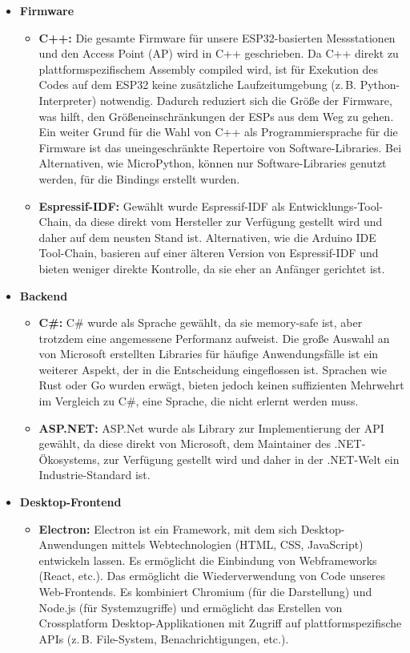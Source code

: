 \documentclass{article}
\begin{document}
\begin{itemize}
  \item \textbf{Firmware}
    \begin{itemize}
      \item \textbf{C++:} Die gesamte Firmware für unsere ESP32-basierten Messstationen und den Access Point (AP) wird in C++ geschrieben. Da C++ direkt zu plattformspezifischem Assembly compiled wird, ist für Exekution des Codes auf dem ESP32 keine zusätzliche Laufzeitumgebung (z.\,B. Python-Interpreter) notwendig. Dadurch reduziert sich die Größe der Firmware, was hilft, den Größeneinschränkungen der ESPs aus dem Weg zu gehen. Ein weiter Grund für die Wahl von C++ als Programmiersprache für die Firmware ist das uneingeschränkte Repertoire von Software-Libraries. Bei Alternativen, wie MicroPython, können nur Software-Libraries genutzt werden, für die Bindings erstellt wurden.
      \item \textbf{Espressif-IDF:} Gewählt wurde Espressif-IDF als Entwicklungs-Tool-Chain, da diese direkt vom Hersteller zur Verfügung gestellt wird und daher auf dem neusten Stand ist. Alternativen, wie die Arduino IDE Tool-Chain, basieren auf einer älteren Version von Espressif-IDF und bieten weniger direkte Kontrolle, da sie eher an Anfänger gerichtet ist.
    \end{itemize}

  \item \textbf{Backend}
    \begin{itemize}
      \item \textbf{C\#:} C\# wurde als Sprache gewählt, da sie memory-safe ist, aber trotzdem eine angemessene Performanz aufweist. Die große Auswahl an von Microsoft erstellten Libraries für häufige Anwendungsfälle ist ein weiterer Aspekt, der in die Entscheidung eingeflossen ist. Sprachen wie Rust oder Go wurden erwägt, bieten jedoch keinen suffizienten Mehrwehrt im Vergleich zu C\#, eine Sprache, die nicht erlernt werden muss.
      \item \textbf{ASP.NET:} ASP.Net wurde als Library zur Implementierung der API gewählt, da diese direkt von Microsoft, dem Maintainer des .NET-Ökosystems, zur Verfügung gestellt wird und daher in der .NET-Welt ein Industrie-Standard ist.
    \end{itemize}

  \item \textbf{Desktop-Frontend}
    \begin{itemize}
      \item \textbf{Electron:} Electron ist ein Framework, mit dem sich Desktop-Anwendungen mittels Webtechnologien (HTML, CSS, JavaScript) entwickeln lassen. Es ermöglicht die Einbindung von Webframeworks (React, etc.). Das ermöglicht die Wiederverwendung von Code unseres Web-Frontends. Es kombiniert Chromium (für die Darstellung) und Node.js (für Systemzugriffe) und ermöglicht das Erstellen von Crossplatform Desktop-Applikationen mit Zugriff auf plattformspezifische APIs (z.\,B. File-System, Benachrichtigungen, etc.).
    \end{itemize}


\end{itemize}
\end{document}
